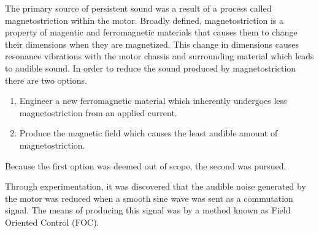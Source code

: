 \documentclass[12pt, letterpaper, twoside]{article}
\begin{document}
The primary source of persistent sound was a result of a process
called magnetostriction within the motor. Broadly defined, magnetostriction
is a property of magentic and ferromagnetic materials that causes them to
change their dimensions when they are magnetized. This change in dimensions
causes resonance vibrations with the motor chassis and surrounding material
which leads to audible sound. In order to reduce the sound produced by
magnetostriction there are two options.
\begin{enumerate}
\item Engineer a new ferromagnetic material which inherently undergoes less
  magnetostriction from an applied current.
\item Produce the magnetic field which causes the least audible amount of
  magnetostriction.
\end{enumerate}
Because the first option was deemed out of scope, the second was pursued.

Through experimentation, it was discovered that the audible noise generated
by the motor was reduced when a smooth sine wave was sent as a commutation
signal. The means of producing this signal was by a method known as Field
Oriented Control (FOC).
\end{document}

